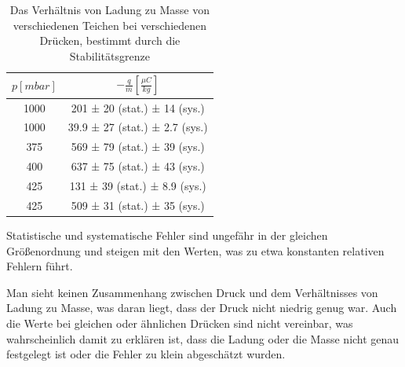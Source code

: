 \documentclass[a4paper,12pt]{article}
\begin{document}
\begin{table}[h]
	\centering
	\begin{tabular}{ c| c }
		$p [\unit{mbar}]$ & $-\frac{q}{m}[\frac{\mu C}{kg}]$ \\
		\hline
		1000 & 201 ± 20 (stat.) ± 14 (sys.)\\
		1000 & 39.9 ± 27 (stat.) ± 2.7 (sys.)\\
		375 & 569 ± 79 (stat.) ± 39 (sys.)\\
		400 & 637 ± 75 (stat.) ± 43 (sys.)\\
		425 & 131 ± 39 (stat.) ± 8.9 (sys.)\\
		425 & 509 ± 31 (stat.) ± 35 (sys.)
	\end{tabular}
\caption{Das Verhältnis von Ladung zu Masse von verschiedenen Teichen bei verschiedenen Drücken, bestimmt durch die Stabilitätsgrenze}
\label{tab:stabil-result}
\end{table}
Statistische und systematische Fehler sind ungefähr in der gleichen Größenordnung und steigen mit den Werten, was zu etwa konstanten relativen Fehlern führt.

Man sieht keinen Zusammenhang zwischen Druck und dem Verhältnisses von Ladung zu Masse, was daran liegt, dass der Druck nicht niedrig genug war.
Auch die Werte bei gleichen oder ähnlichen Drücken sind nicht vereinbar, was wahrscheinlich damit zu erklären ist, dass die Ladung oder die Masse nicht genau festgelegt ist 
oder die Fehler zu klein abgeschätzt wurden.
\end{document}
